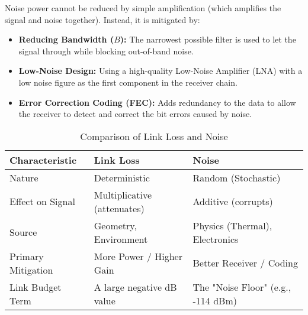 Noise power cannot be reduced by simple amplification (which amplifies the signal and noise together). Instead, it is mitigated by:
\begin{itemize}
    \item \textbf{Reducing Bandwidth ($B$):} The narrowest possible filter is used to let the signal through while blocking out-of-band noise.
    \item \textbf{Low-Noise Design:} Using a high-quality Low-Noise Amplifier (LNA) with a low noise figure as the first component in the receiver chain.
    \item \textbf{Error Correction Coding (FEC):} Adds redundancy to the data to allow the receiver to detect and correct the bit errors caused by noise.
\end{itemize}


\begin{table}[H]
    \centering
    \caption{Comparison of Link Loss and Noise}
    \label{tab:loss-vs-noise}
    \begin{tabular}{@{}lll@{}}
        \toprule
        \tableheaderfont Characteristic & \tableheaderfont Link Loss & \tableheaderfont Noise \\
        \midrule
        Nature & Deterministic & Random (Stochastic) \\
        Effect on Signal & Multiplicative (attenuates) & Additive (corrupts) \\
        Source & Geometry, Environment & Physics (Thermal), Electronics \\
        Primary Mitigation & More Power / Higher Gain & Better Receiver / Coding \\
        Link Budget Term & A large negative dB value & The "Noise Floor" (e.g., -114 dBm) \\
        \bottomrule
    \end{tabular}
\end{table}


